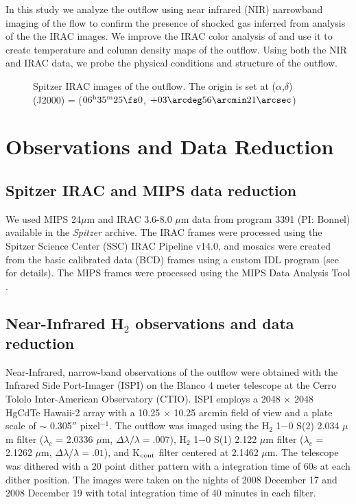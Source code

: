 \documentclass[iop]{emulateapj}
\begin{document}
In this study we analyze the outflow using near infrared (NIR) narrowband 
imaging of the flow to confirm the presence of shocked gas 
inferred from analysis of the the IRAC images. 
We improve the IRAC color analysis of \citet{yba2009} and use it to create
temperature and column density maps of the outflow. Using both
the NIR and IRAC data, we probe the physical conditions and structure of the
outflow.

\begin{figure*}
\caption{ Spitzer IRAC images of the outflow. 
The origin is set at 
($\alpha$,$\delta$)(J2000) =
($06^{\rm{h}}35^{\rm{m}}25\fs 0$, $+03\arcdeg56\arcmin21\arcsec$)
}
\end{figure*}

\section{Observations and Data Reduction}

\subsection{Spitzer IRAC and MIPS data reduction}

We used MIPS 24$\mu$m and IRAC 3.6-8.0 $\mu$m data from program 3391
(PI: Bonnel) available in the {\it Spitzer } archive. The IRAC frames
were processed using the Spitzer Science Center (SSC) IRAC Pipeline
v14.0, and mosaics were created from the basic calibrated data (BCD)
frames using a custom IDL program (see \citet{Guter08} for details). The
MIPS frames were processed using the MIPS Data Analysis Tool
\citep{Gordon05}.


\subsection{Near-Infrared H$_2$ observations and data reduction}

Near-Infrared, narrow-band observations of the outflow were obtained
with the Infrared Side Port-Imager (ISPI) on the Blanco 4 meter
telescope at the Cerro Tololo Inter-American Observatory (CTIO).  ISPI
employs a 2048 $\times$ 2048 HgCdTe Hawaii-2 array with a 10.25
$\times$ 10.25 arcmin field of view and a plate scale of $\sim$
0.305$''$ pixel$^{-1}$. The outflow was imaged using the H$_2$ 1$-$0
S(2) 2.034 $\mu$m filter ($\lambda_{c}$ = 2.0336 $\mu$m, $\Delta \lambda/\lambda = .007$), 
H$_2$ 1$-$0 S(1) 2.122 $\mu$m filter
($\lambda_{c}$ = 2.1262 $\mu$m, $\Delta \lambda/\lambda = .01$), 
and K$_{\rm{cont}}$ filter centered at
2.1462 $\mu$m. The telescope was dithered with a 20 point dither
pattern with a integration time of 60s at each dither position. The
images were taken on the nights of 2008 December 17 and 2008 December
19 with total integration time of 40 minutes in each filter.
\end{document}
